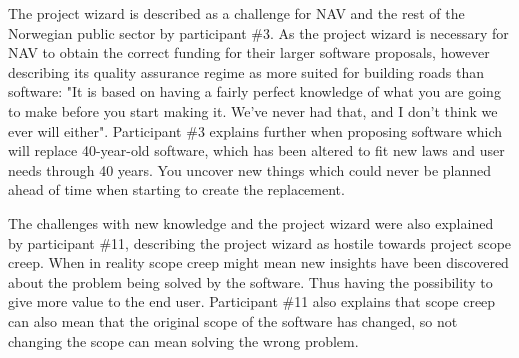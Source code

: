The project wizard is described as a challenge for NAV and the rest of the Norwegian public sector by participant \#3. As the project wizard is necessary for NAV to obtain the correct funding for their larger software proposals, however describing its quality assurance regime as more suited for building roads than software: "It is based on having a fairly perfect knowledge of what you are going to make before you start making it. We've never had that, and I don't think we ever will either". Participant \#3 explains further when proposing software which will replace 40-year-old software, which has been altered to fit new laws and user needs through 40 years. You uncover new things which could never be planned ahead of time when starting to create the replacement.


The challenges with new knowledge and the project wizard were also explained by participant \#11, describing the project wizard as hostile towards project scope creep. When in reality scope creep might mean new insights have been discovered about the problem being solved by the software. Thus having the possibility to give more value to the end user. Participant \#11 also explains that scope creep can also mean that the original scope of the software has changed, so not changing the scope can mean solving the wrong problem.


